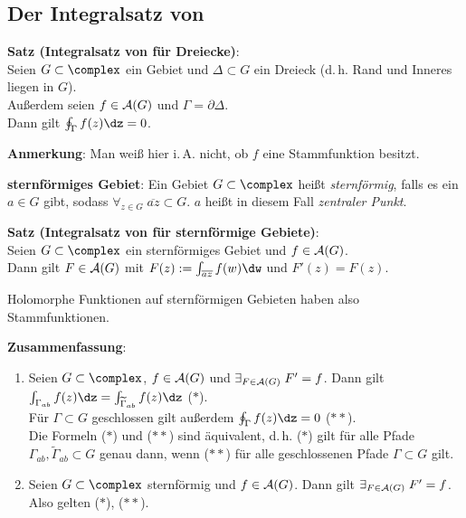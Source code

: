 \subsection{%
    Der Integralsatz von %
}

\textbf{Satz (Integralsatz von  für Dreiecke)}:\\
Seien $G \subset \complex$ ein Gebiet und $\Delta \subset G$ ein Dreieck
(d.\,h. Rand und Inneres liegen in $G$).\\
Außerdem seien $f \in \mathcal{A}(G)$ und $\Gamma = \partial \Delta$.\\
Dann gilt $\oint_\Gamma f(z)\dz = 0$.

\textbf{Anmerkung}:
Man weiß hier i.\,A. nicht, ob $f$ eine Stammfunktion besitzt.

\linie

\textbf{sternförmiges Gebiet}:
Ein Gebiet $G \subset \complex$ heißt \emph{sternförmig}, falls es ein
$a \in G$ gibt, sodass
$\forall_{z \in G}\; \overline{az} \subset G$.
$a$ heißt in diesem Fall \emph{zentraler Punkt}.

\textbf{Satz (Integralsatz von  für sternförmige Gebiete)}:\\
Seien $G \subset \complex$ ein sternförmiges Gebiet und $f \in \mathcal{A}(G)$.\\
Dann gilt $F \in \mathcal{A}(G)$ mit $F(z) := \int_{\overline{az}} f(w)\dw$ und
$F'(z) = F(z)$.

Holomorphe Funktionen auf sternförmigen Gebieten haben also Stammfunktionen.

\linie

\textbf{Zusammenfassung}:
\begin{enumerate}
    \item
    Seien $G \subset \complex$, $f \in \mathcal{A}(G)$ und
    $\exists_{F \in \mathcal{A}(G)}\; F' = f$.
    Dann gilt $\int_{\Gamma_{ab}} f(z)\dz =
    \int_{\widetilde{\Gamma}_{ab}} f(z)\dz$ ($\ast$).\\
    Für $\Gamma \subset G$ geschlossen gilt außerdem $\oint_\Gamma f(z)\dz = 0$
    ($\ast\ast$).\\
    Die Formeln ($\ast$) und ($\ast\ast$) sind äquivalent, d.\,h.
    ($\ast$) gilt für alle Pfade
    $\Gamma_{ab}, \widetilde{\Gamma}_{ab} \subset G$
    genau dann, wenn ($\ast\ast$) für alle geschlossenen Pfade
    $\Gamma \subset G$ gilt.

    \item
    Seien $G \subset \complex$ sternförmig und $f \in \mathcal{A}(G)$.
    Dann gilt $\exists_{F \in \mathcal{A}(G)}\; F' = f$.
    Also gelten ($\ast$), ($\ast\ast$).
\end{enumerate}


